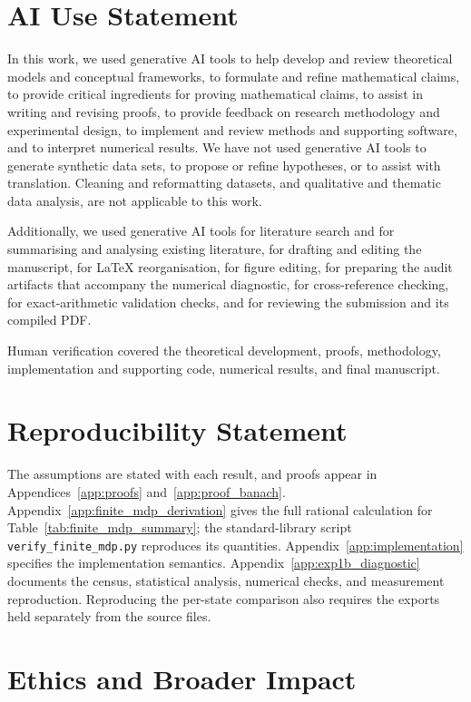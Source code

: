\documentclass{article}
\theoremstyle{plain}
\theoremstyle{definition}
\theoremstyle{remark}
\begin{document}
\section*{AI Use Statement}
\label{sec:ai_use}
In this work, we used generative AI tools to help develop and review theoretical
models and conceptual frameworks, to formulate and refine mathematical claims, to
provide critical ingredients for proving mathematical claims, to assist in writing
and revising proofs, to provide feedback on research methodology and experimental
design, to implement and review methods and supporting software, and to interpret
numerical results. We have not used generative AI tools to generate synthetic data
sets, to propose or refine hypotheses, or to assist with translation. Cleaning and
reformatting datasets, and qualitative and thematic data analysis, are not
applicable to this work.

Additionally, we used generative AI tools for literature search and for summarising
and analysing existing literature, for drafting and editing the manuscript, for
LaTeX reorganisation, for figure editing, for preparing the audit artifacts that
accompany the numerical diagnostic, for cross-reference checking, for
exact-arithmetic validation checks, and for reviewing the submission and its
compiled PDF.

Human verification covered the theoretical development, proofs, methodology,
implementation and supporting code, numerical results, and final manuscript.

\section*{Reproducibility Statement}
\label{sec:reproducibility}
The assumptions are stated with each result, and proofs appear in
Appendices~\ref{app:proofs} and~\ref{app:proof_banach}.
Appendix~\ref{app:finite_mdp_derivation} gives the full rational calculation
for Table~\ref{tab:finite_mdp_summary}; the standard-library script
\texttt{verify\_finite\_mdp.py} reproduces its quantities.
Appendix~\ref{app:implementation} specifies the implementation semantics.
Appendix~\ref{app:exp1b_diagnostic} documents the census, statistical analysis,
numerical checks, and measurement reproduction. Reproducing the per-state
comparison also requires the exports held separately from the source files.

\section*{Ethics and Broader Impact}
\label{app:ethics_broader}
\end{document}
